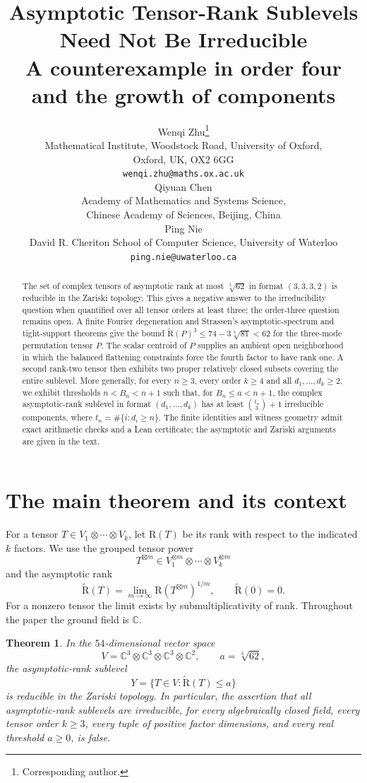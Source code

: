 \documentclass[10pt,a4paper]{article}
\title{Asymptotic Tensor-Rank Sublevels Need Not Be Irreducible\\[2pt]\large A counterexample in order four and the growth of components}
\author{%
Wenqi Zhu\thanks{Corresponding author.}\\
{\small Mathematical Institute, Woodstock Road, University of Oxford,}\\
{\small Oxford, UK, OX2 6GG}\\
{\small\texttt{wenqi.zhu@maths.ox.ac.uk}}\\[1ex]
Qiyuan Chen\\
{\small Academy of Mathematics and Systems Science,}\\
{\small Chinese Academy of Sciences, Beijing, China}\\[1ex]
Ping Nie\\
{\small David R. Cheriton School of Computer Science, University of Waterloo}\\
{\small\texttt{ping.nie@uwaterloo.ca}}}
\date{}
\newtheorem{theorem}{Theorem}[section]
\theoremstyle{definition}
\theoremstyle{remark}
\numberwithin{equation}{section}
\newcommand{\C}{\mathbb C}
\newcommand{\AR}{\widetilde{\mathrm R}}
\newcommand{\R}{\mathrm R}
\begin{document}
\maketitle
\begin{abstract}
The set of complex tensors of asymptotic rank at most $\sqrt[3]{62}$
in format $(3,3,3,2)$ is reducible in the Zariski topology.
This gives a negative answer to the irreducibility question when
quantified over all tensor orders at least three; the order-three
question remains open. A finite Fourier degeneration and Strassen's
asymptotic-spectrum and tight-support theorems give the bound
$\AR(P)^3\leq 74-3\sqrt[3]{81}<62$ for the three-mode permutation
tensor $P$. The scalar centroid of $P$ supplies an ambient open
neighborhood in which the balanced flattening constraints force the
fourth factor to have rank one. A second rank-two tensor then exhibits
two proper relatively closed subsets covering the entire sublevel.
More generally, for every $n\geq3$, every order $k\geq4$ and all
$d_1,\ldots,d_k\geq2$, we exhibit
thresholds $n<B_n<n+1$ such that, for $B_n\leq a<n+1$, the complex
asymptotic-rank sublevel in format $(d_1,\ldots,d_k)$ has at least
$\binom{t_n}{3}+1$ irreducible components, where $t_n=\#\{i:d_i\geq n\}$.
The finite identities and witness geometry admit exact arithmetic
checks and a Lean certificate; the asymptotic and Zariski arguments
are given in the text.
\end{abstract}

\section{The main theorem and its context}\label{sec:intro}

For a tensor $T\in V_1\otimes\cdots\otimes V_k$, let $\R(T)$ be
its rank with respect to the indicated $k$ factors. We use the grouped
tensor power
\[
 T^{\boxtimes m}\in V_1^{\otimes m}\otimes\cdots\otimes V_k^{\otimes m}
\]
and the asymptotic rank
\begin{equation}\label{eq:asymrank}
 \AR(T)=\lim_{m\to\infty}\R(T^{\boxtimes m})^{1/m},
 \qquad \AR(0)=0.
\end{equation}
For a nonzero tensor the limit exists by submultiplicativity of rank.
Throughout the paper the ground field is $\C$.

\begin{theorem}\label{thm:main}
In the $54$-dimensional vector space
\[
 V=\C^3\otimes\C^3\otimes\C^3\otimes\C^2,
 \qquad a=\sqrt[3]{62},
\]
the asymptotic-rank sublevel
\begin{equation}\label{eq:Y}
 Y=\{T\in V:\AR(T)\leq a\}
\end{equation}
is reducible in the Zariski topology. In particular, the assertion that
all asymptotic-rank sublevels are irreducible, for every algebraically
closed field, every tensor order $k\geq3$, every tuple of positive
factor dimensions, and every real threshold $a\geq0$, is false.
\end{theorem}
\end{document}
